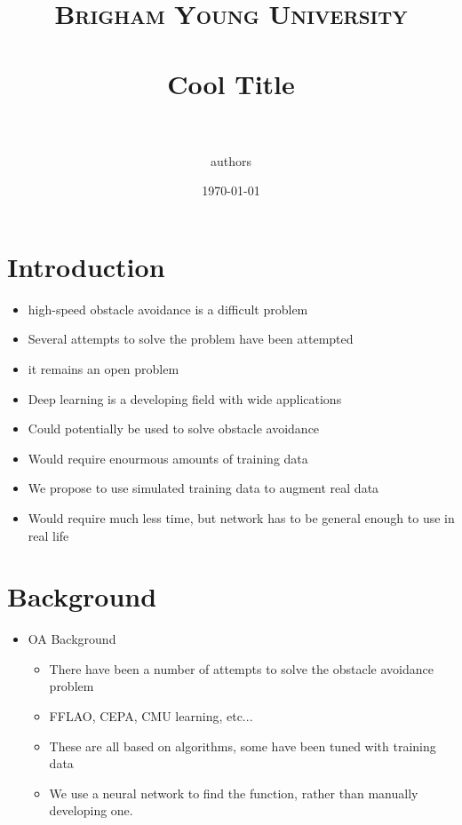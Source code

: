 \documentclass[paper=a4, fontsize=11pt]{scrartcl} %
\title{
\normalfont \normalsize
\textsc{Brigham Young University} \\ [25pt] %
\horrule{0.5pt} \\[0.4cm] %
\huge Cool Title \\ %
\horrule{2pt} \\[0.5cm] %
}
\author{authors} %
\date{\normalsize\today} %
\begin{document}
\maketitle %





\section{Introduction}

\begin{itemize}
	\item high-speed obstacle avoidance is a difficult problem
	\item Several attempts to solve the problem have been attempted
	\item it remains an open problem
	\item Deep learning is a developing field with wide applications
	\item Could potentially be used to solve obstacle avoidance
	\item Would require enourmous amounts of training data
	\item We propose to use simulated training data to augment real data
	\item Would require much less time, but network has to be general enough to use in real life
\end{itemize}

\section{Background}

\begin{itemize}
	\item OA Background
	\begin{itemize}
		\item There have been a number of attempts to solve the obstacle avoidance problem
		\item FFLAO, CEPA, CMU learning, etc...
		\item These are all based on algorithms, some have been tuned with training data
		\item We use a neural network to find the function, rather than manually developing one.
	\end{itemize}
\end{itemize}
\end{document}
